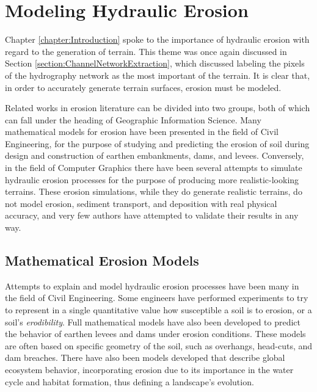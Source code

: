 \section{Modeling Hydraulic Erosion}

Chapter \ref{chapter:Introduction} spoke to the importance of hydraulic erosion with regard to the generation of terrain. This theme was once again discussed in Section \ref{section:ChannelNetworkExtraction}, which discussed labeling the pixels of the hydrography network as the most important of the terrain. It is clear that, in order to accurately generate terrain surfaces, erosion must be modeled.

Related works in erosion literature can be divided into two groups, both of which can fall under the heading of Geographic Information Science. Many mathematical models for erosion have been presented in the field of Civil Engineering, for the purpose of studying and predicting the erosion of soil during design and construction of earthen embankments, dams, and levees. Conversely, in the field of Computer Graphics there have been several attempts to simulate hydraulic erosion processes for the purpose of producing more realistic-looking terrains. These erosion simulations, while they do generate realistic terrains, do not model erosion, sediment transport, and deposition with real physical accuracy, and very few authors have attempted to validate their results in any way.

\subsection{Mathematical Erosion Models}

Attempts to explain and model hydraulic erosion processes have been many in the field of Civil Engineering. Some engineers have performed experiments to try to represent in a single quantitative value how susceptible a soil is to erosion, or a soil's \textit{erodibility}. Full mathematical models have also been developed to predict the behavior of earthen levees and dams under erosion conditions. These models are often based on specific geometry of the soil, such as overhangs, head-cuts, and dam breaches. There have also been models developed that describe global ecosystem behavior, incorporating erosion due to its importance in the water cycle and habitat formation, thus defining a landscape's evolution.


